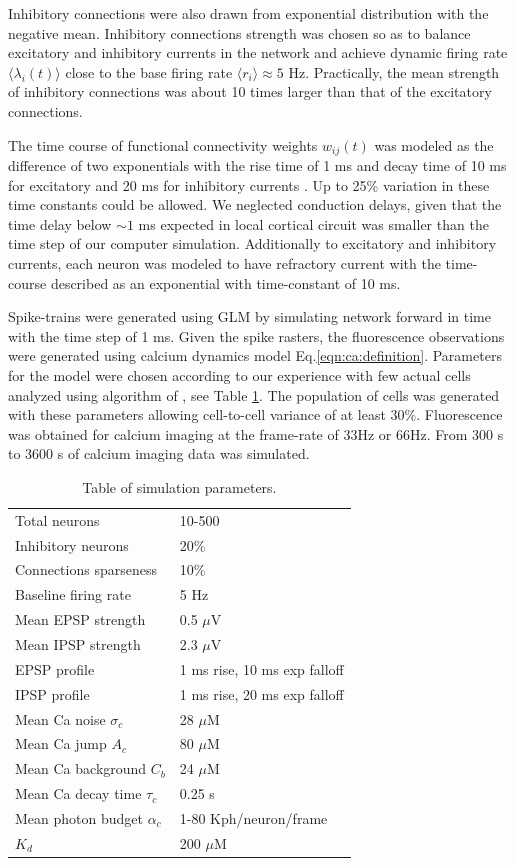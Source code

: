 Inhibitory connections were also drawn from exponential distribution with the negative mean. Inhibitory connections strength was chosen so as to balance excitatory and inhibitory currents in the network and achieve dynamic firing rate $\langle \lambda_i(t) \rangle$ close to the base firing rate $\langle r_i\rangle \approx 5 $ Hz. Practically, the mean strength of inhibitory connections was about 10 times larger than that of the excitatory connections. 

The time course of functional connectivity weights $w_{ij}(t)$ was modeled as the difference of two exponentials with the rise time of 1 ms and decay time of 10 ms for excitatory and 20 ms for inhibitory currents \cite{Sayer1990}. Up to 25\% variation in these time constants could be allowed. We neglected conduction delays, given that the time delay below $\sim 1$ ms expected in local cortical circuit was smaller than the time step of our computer simulation.  Additionally to excitatory and inhibitory currents, each neuron was modeled to have refractory current with the time-course described as an exponential with time-constant of 10 ms.

Spike-trains were generated using GLM by simulating network forward in time with the time step of 1 ms.  Given the spike rasters, the fluorescence observations were generated using calcium dynamics model Eq.\eqref{eqn:ca:definition}. Parameters for the model were chosen according to our experience with few actual cells analyzed using algorithm of \cite{Vogelstein2009}, see Table \ref{table:caparm}.  The population of cells was generated with these parameters allowing cell-to-cell variance of at least 30\%.  Fluorescence was obtained for calcium imaging at the frame-rate of 33Hz or 66Hz.  From 300 s to 3600 s of calcium imaging data was simulated.

\begin{table}[h!b!p!]
\caption{Table of simulation parameters.}\label{table:caparm}
\begin{tabular}{ll}
\hline
Total neurons & 10-500 \\
Inhibitory neurons & 20\% \\
Connections sparseness & 10\% \\
Baseline firing rate & 5 Hz \\
Mean EPSP strength & 0.5 $\mu$V \\
Mean IPSP strength & 2.3 $\mu$V\\
EPSP profile & 1 ms rise, 10 ms exp falloff \\
IPSP profile & 1 ms rise, 20 ms exp falloff \\
\hline
Mean Ca noise $\sigma_c$ & 28 $\mu$M \\
Mean Ca jump $A_c$ & 80 $\mu$M \\
Mean Ca background $C_b$ & 24 $\mu$M \\
Mean Ca decay time $\tau_c$ & 0.25 s \\
Mean photon budget $\alpha_c$ & 1-80 Kph/neuron/frame \\
$K_d$ & 200 $\mu$M \\
\hline
\end{tabular}
\end{table}

